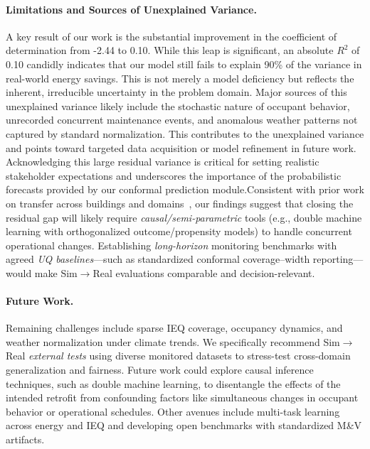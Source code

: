 ﻿\documentclass{article}
\begin{document}
\paragraph{Limitations and Sources of Unexplained Variance.}
A key result of our work is the substantial improvement in the coefficient of determination from -2.44 to 0.10. While this leap is significant, an absolute $R^2$ of 0.10 candidly indicates that our model still fails to explain 90\% of the variance in real-world energy savings. This is not merely a model deficiency but reflects the inherent, irreducible uncertainty in the problem domain. Major sources of this unexplained variance likely include the stochastic nature of occupant behavior, unrecorded concurrent maintenance events, and anomalous weather patterns not captured by standard normalization. This contributes to the unexplained variance and points toward targeted data acquisition or model refinement in future work. Acknowledging this large residual variance is critical for setting realistic stakeholder expectations and underscores the importance of the probabilistic forecasts provided by our conformal prediction module.Consistent with prior work on transfer across buildings and domains~\citep{hong2020transfer,mahnke2022transfer}, our findings suggest that closing the residual gap will likely require \emph{causal/semi-parametric} tools (e.g., double machine learning with orthogonalized outcome/propensity models) to handle concurrent operational changes. Establishing \emph{long-horizon} monitoring benchmarks with agreed \emph{UQ baselines}---such as standardized conformal coverage--width reporting---would make Sim$\rightarrow$Real evaluations comparable and decision-relevant.


\paragraph{Future Work.} Remaining challenges include sparse IEQ coverage, occupancy dynamics, and weather normalization under climate trends. We specifically recommend Sim$\rightarrow$Real \emph{external tests} using diverse monitored datasets to stress-test cross-domain generalization and fairness.
Future work could explore causal inference techniques, such as double machine learning, to disentangle the effects of the intended retrofit from confounding factors like simultaneous changes in occupant behavior or operational schedules. Other avenues include multi-task learning across energy and IEQ and developing open benchmarks with standardized M\&V artifacts.
\end{document}
